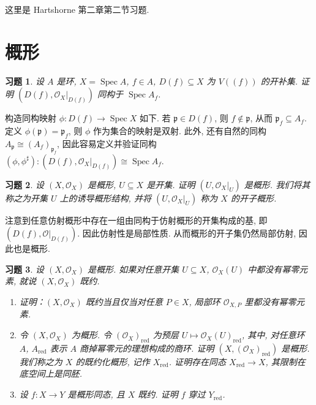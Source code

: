 \documentclass{article}
\theoremstyle{exercise}
\newtheorem{exercise}{习题}[section]
\newenvironment{proofc}{\proof}{\endproof}
\def\gp{\mathfrak{p}}
\def\sO{\mathscr{O}}
\def\red{\mathrm{red}}
\def\Spec{\operatorname{Spec}}
\begin{document}
这里是 Hartshorne 第二章第二节习题.

\setcounter{section}{1}

\section{概形}

\begin{exercise}
  设 $A$ 是环, $X = \Spec A$, $f \in A$, $D(f) \subseteq X$ 为 $V((f))$ 的开补集.
  证明 $(D(f), \sO_X|_{D(f)})$ 同构于 $\Spec A_f$.
\end{exercise}

\begin{proofc}
  构造同构映射 $\phi \colon D(f) \to \Spec X$ 如下.
  若 $\gp \in D(f)$, 则 $f \notin \gp$, 从而 $\gp_f \subseteq A_f$.
  定义 $\phi(\gp) = \gp_f$, 则 $\phi$ 作为集合的映射是双射.
  此外, 还有自然的同构 $A_{\gp} \cong (A_f)_{\gp_f}$,
  因此容易定义并验证同构 $(\phi, \phi^\sharp) \colon (D(f), \sO_X|_{D(f)}) \cong \Spec A_f$.
\end{proofc}

\begin{exercise}
  设 $(X, \sO_X)$ 是概形, $U \subseteq X$ 是开集. 证明 $(U, \sO_X|_U)$ 是概形.
  我们将其称之为开集 $U$ 上的\emph{诱导概形结构},
  并将 $(U, \sO_X|_U)$ 称为 $X$ 的\emph{开子概形}.
\end{exercise}

\begin{proofc}
  注意到任意仿射概形中存在一组由同构于仿射概形的开集构成的基,
  即 $(D(f), \sO|_{D(f)})$. 因此仿射性是局部性质.
  从而概形的开子集仍然局部仿射, 因此也是概形.
\end{proofc}

\begin{exercise}
  设 $(X, \sO_X)$ 是概形. 如果对任意开集 $U \subseteq X$, $\sO_X(U)$ 中都没有幂零元素,
  就说 $(X, \sO_X)$ \emph{既约}.
  \begin{enumerate}[label={(\alph*)}]
    \item 证明：$(X, \sO_X)$ 既约当且仅当对任意 $P \in X$, 局部环 $\sO_{X, P}$ 里都没有幂零元素.
    \item 令 $(X, \sO_X)$ 为概形. 令 $(\sO_X)_{\red}$ 为预层 $U \mapsto \sO_X(U)_{\red}$,
          其中, 对任意环 $A$, $A_{\red}$ 表示 $A$ 商掉幂零元的理想构成的商环.
          证明 $(X, (\sO_X)_{\red})$ 是概形.
          我们称之为 $X$ 的\emph{既约化概形}, 记作 $X_{\red}$.
          证明存在同态 $X_{\red} \to X$, 其限制在底空间上是同胚.
    \item 设 $f \colon X \to Y$ 是概形同态, 且 $X$ 既约. 证明 $f$ 穿过 $Y_{\red}$.
  \end{enumerate}
\end{exercise}
\end{document}
